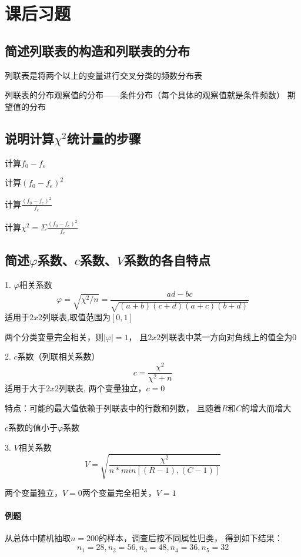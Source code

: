 \documentclass[UTF8,10pt]{book}
\begin{document}
\section{课后习题}
{\kaishu
\subsection{简述列联表的构造和列联表的分布}	
列联表是将两个以上的变量进行交叉分类的频数分布表 

列联表的分布观察值的分布——条件分布（每个具体的观察值就是条件频数）
期望值的分布	

\subsection{说明计算$\chi^2$统计量的步骤}	

计算$f_0 -f_e$

计算$(f_0 -f_e)^2$

计算$\frac{(f_0 -f_e)^2}{f_e}$

计算$\chi^2 = \Sigma \frac{(f_0-f_e)^2}{f_e} $	



\subsection{简述$\varphi$系数、$c$系数、$V$系数的各自特点}	

1. $\varphi $相关系数 
$$\varphi = \sqrt{\chi^2/n} = \frac{ad-bc}{\sqrt{(a+b)(c+d)(a+c)(b+d)}}$$ 
适用于$2x2$列联表,取值范围为$[0,1]$

两个分类变量完全相关，则$|\varphi|=1$，
且$2x2$列联表中某一方向对角线上的值全为0 

2. $c$系数（列联相关系数） 
$$c = \frac{\chi^2}{\chi^2 + n}$$ 
适用于大于$2x2$列联表,
两个变量独立，$c=0$

特点：可能的最大值依赖于列联表中的行数和列数，
且随着$R$和$C$的增大而增大

$c$系数的值小于$\varphi$系数 

3. $V$相关系数 
$$V = \sqrt{\frac{\chi^2}{n*min[(R-1),(C-1)]}}$$ 

两个变量独立，$V=0$两个变量完全相关，$V=1$	



\paragraph{例题}

从总体中随机抽取$n=200$的样本，调查后按不同属性归类，
得到如下结果： 
$$ n_1 = 28 , n_2 = 56 , n_3 = 48 , n_4 = 36 , n_5 = 32 $$ 

}
\end{document}
